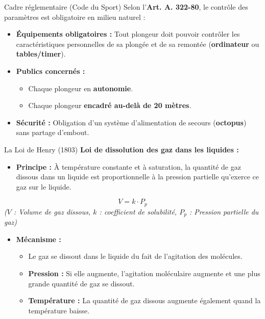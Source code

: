 \begin{frame}{Cadre réglementaire (Code du Sport)}
    Selon l'\textbf{Art. A. 322-80}, le contrôle des paramètres est obligatoire en milieu naturel :
    \begin{itemize}
        \item \textbf{Équipements obligatoires :} \textcolor{ffessmred}{Tout plongeur doit pouvoir contrôler les caractéristiques personnelles de sa plongée et de sa remontée (\textbf{ordinateur} ou \textbf{tables/timer}).}
        \item \textbf{Publics concernés :} 
        \begin{itemize}
            \item Chaque plongeur en \textbf{autonomie}.
            \item Chaque plongeur \textbf{encadré au-delà de 20 mètres}.
        \end{itemize}
        \item \textbf{Sécurité :} Obligation d'un système d'alimentation de secours (\textbf{octopus}) sans partage d'embout.
    \end{itemize}
\end{frame}

\begin{frame}{La Loi de Henry (1803)}
    \textbf{Loi de dissolution des gaz dans les liquides :}
    
    \begin{itemize}
        \item \textbf{Principe :} À température constante et à saturation, la quantité de gaz dissous dans un liquide est proportionnelle à la pression partielle qu'exerce ce gaz sur le liquide.
    \end{itemize}

    \begin{equation*}
        V = k \cdot P_p
    \end{equation*}
    \centering \textit{\small ($V$ : Volume de gaz dissous, $k$ : coefficient de solubilité, $P_p$ : Pression partielle du gaz)}

    \begin{itemize}
        \item \textbf{Mécanisme :} 
        \begin{itemize}
            \item Le gaz se dissout dans le liquide du fait de l'agitation des molécules.
            \item \textbf{Pression :} Si elle augmente, l'agitation moléculaire augmente et une plus grande quantité de gaz se dissout.
            \item \textbf{Température :} La quantité de gaz dissous augmente également quand la température baisse.
        \end{itemize}
    \end{itemize}
\end{frame}

